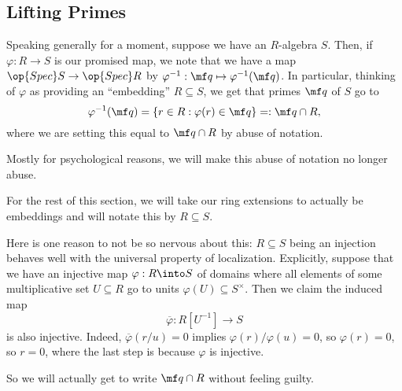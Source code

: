 \subsection{Lifting Primes}
Speaking generally for a moment, suppose we have an $R$-algebra $S$. Then, if $\varphi:R\to S$ is our promised map, we note that we have a map $\op{Spec}S\to\op{Spec}R$ by $\varphi^{-1}:\mf q\mapsto\varphi^{-1}(\mf q)$. In particular, thinking of $\varphi$ as providing an ``embedding'' $R\subseteq S$, we get that primes $\mf q$ of $S$ go to
\[\varphi^{-1}(\mf q)=\{r\in R:\varphi(r)\in\mf q\}=:\mf q\cap R,\]
where we are setting this equal to $\mf q\cap R$ by abuse of notation.

Mostly for psychological reasons, we will make this abuse of notation no longer abuse.
\begin{convention}
	For the rest of this section, we will take our ring extensions to actually be embeddings and will notate this by $R\subseteq S$.
\end{convention}
\begin{remark}[Nir] \label{rem:localizebasering}
	Here is one reason to not be so nervous about this: $R\subseteq S$ being an injection behaves well with the universal property of localization. Explicitly, suppose that we have an injective map $\varphi:R\into S$ of domains where all elements of some multiplicative set $U\subseteq R$ go to units $\varphi(U)\subseteq S^\times$. Then we claim the induced map
	\[\overline\varphi:R\left[U^{-1}\right]\to S\]
	is also injective. Indeed, $\overline\varphi(r/u)=0$ implies $\varphi(r)/\varphi(u)=0$, so $\varphi(r)=0$, so $r=0$, where the last step is because $\varphi$ is injective.
\end{remark}
So we will actually get to write $\mf q\cap R$ without feeling guilty.

